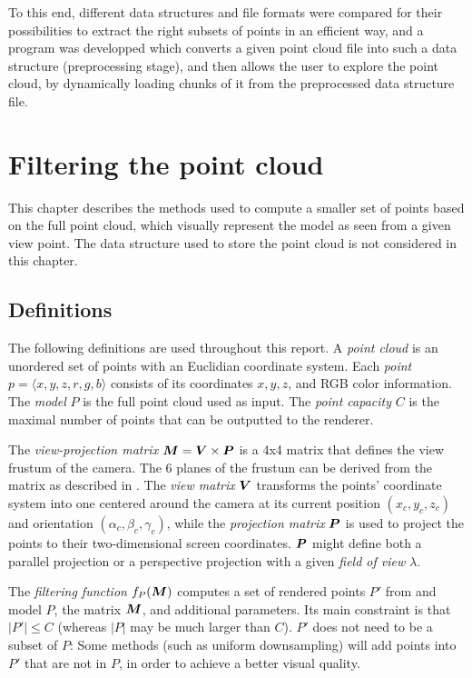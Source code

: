 \documentclass[a4paper,11pt,abstracton,notitlepage]{scrreprt}
\begin{document}
To this end, different data structures and file formats were compared for their possibilities to extract the right subsets of points in an efficient way, and a program was developped which converts a given point cloud file into such a data structure (preprocessing stage), and then allows the user to explore the point cloud, by dynamically loading chunks of it from the preprocessed data structure file.


\chapter{Filtering the point cloud}
This chapter describes the methods used to compute a smaller set of points based on the full point cloud, which visually represent the model as seen from a given view point. The data structure used to store the point cloud is not considered in this chapter.

\section{Definitions}
The following definitions are used throughout this report. A \emph{point cloud} is an unordered set of points with an Euclidian coordinate system. Each \emph{point} $p = \langle x, y, z, r, g, b\rangle$ consists of its coordinates $x, y, z$, and RGB color information. The \emph{model} $P$ is the full point cloud used as input. The \emph{point capacity} $C$ is the maximal number of points that can be outputted to the renderer. 

The \emph{view-projection matrix} $\matrixsym{M} = \matrixsym{V} \times \matrixsym{P}$ is a 4x4 matrix that defines the view frustum of the camera. The 6 planes of the frustum can be derived from the matrix as described in \cite{Gri2001}. The \emph{view matrix} $\matrixsym{V}$ transforms the points' coordinate system into one centered around the camera at its current position $(x_{c}, y_{c}, z_{c})$ and orientation $(\alpha_{c}, \beta_{c}, \gamma_{c})$, while the \emph{projection matrix} $\matrixsym{P}$ is used to project the points to their two-dimensional screen coordinates. $\matrixsym{P}$ might define both a parallel projection or a perspective projection with a given \emph{field of view} $\lambda$.

The \emph{filtering function} $f_{P}(\matrixsym{M})$ computes a set of rendered points $P'$ from and model $P$, the matrix $\matrixsym{M}$, and additional parameters. Its main constraint is that $|P'| \leq C$ (whereas $|P|$ may be much larger than $C$). $P'$ does not need to be a subset of $P$: Some methods (such as uniform downsampling) will add points into $P'$ that are not in $P$, in order to achieve a better visual quality.
\end{document}
